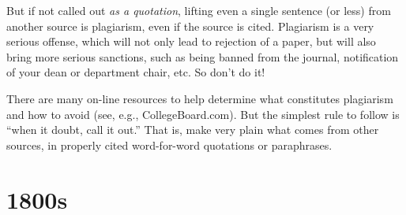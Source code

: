 \documentclass[opre,nonblindrev]{informs3} %
\begin{document}
But if not called out {\em as a quotation}, lifting even a single
sentence (or less) from another source is plagiarism, even if the
source is cited.  Plagiarism is a very serious offense, which will
not only lead to rejection of a paper, but will also bring more
serious sanctions, such as being banned from the journal,
notification of your dean or department chair, etc.  So don't do it!

There are many on-line resources to help determine what constitutes
plagiarism and how to avoid (see, e.g., CollegeBoard.com).  But the
simplest rule to follow is ``when it doubt, call it out.''  That is,
make very plain what comes from other sources, in properly cited
word-for-word quotations or paraphrases.

\section{1800s}
\end{document}
